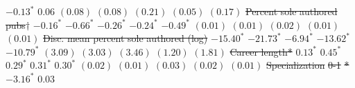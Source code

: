 \documentclass[
  10pt,
  letterpaper,
]{article}
\providecommand{\DIFdeltex}[1]{{\protect\color{red}\sout{#1}}}                      %
\providecommand{\DIFdelFL}[1]{\DIFdel{#1}} %
\providecommand{\DIFdel}[1]{\texorpdfstring{\DIFdeltex{#1}}{}} %
\begin{document}
\begin{table}
\begin{adjustwidth}{-1.5in}{0in}
\DIFdelFL{$-0.13^{*}$  }%
\DIFdelFL{$0.06$       }%
\DIFdelFL{$(0.08)$     }%
\DIFdelFL{$(0.08)$     }%
\DIFdelFL{$(0.21)$    }%
\DIFdelFL{$(0.05)$     }%
\DIFdelFL{$(0.17)$     }%
\DIFdelFL{Percent sole authored pubs$\dagger$     }%
\DIFdelFL{$-0.16^{*}$  }%
\DIFdelFL{$-0.66^{*}$  }%
\DIFdelFL{$-0.26^{*}$ }%
\DIFdelFL{$-0.24^{*}$  }%
\DIFdelFL{$-0.49^{*}$  }%
\DIFdelFL{$(0.01)$     }%
\DIFdelFL{$(0.01)$     }%
\DIFdelFL{$(0.02)$    }%
\DIFdelFL{$(0.01)$     }%
\DIFdelFL{$(0.01)$     }%
\DIFdelFL{Disc. mean percent sole authored (log)  }%
\DIFdelFL{$-15.40^{*}$ }%
\DIFdelFL{$-21.73^{*}$ }%
\DIFdelFL{$-6.94^{*}$ }%
\DIFdelFL{$-13.62^{*}$ }%
\DIFdelFL{$-10.79^{*}$ }%
\DIFdelFL{$(3.09)$     }%
\DIFdelFL{$(3.03)$     }%
\DIFdelFL{$(3.46)$    }%
\DIFdelFL{$(1.20)$     }%
\DIFdelFL{$(1.81)$     }%
\DIFdelFL{Career length*                          }%
\DIFdelFL{$0.13^{*}$   }%
\DIFdelFL{$0.45^{*}$   }%
\DIFdelFL{$0.29^{*}$  }%
\DIFdelFL{$0.31^{*}$   }%
\DIFdelFL{$0.30^{*}$   }%
\DIFdelFL{$(0.02)$     }%
\DIFdelFL{$(0.01)$     }%
\DIFdelFL{$(0.03)$    }%
\DIFdelFL{$(0.02)$     }%
\DIFdelFL{$(0.01)$     }%
\DIFdelFL{Specialization }%
\DIFdelFL{0-1}%
\DIFdelFL{*                   }%
\DIFdelFL{$-3.16^{*}$  }%
\DIFdelFL{$0.03$       }%

\end{adjustwidth}
\end{table}
\end{document}
